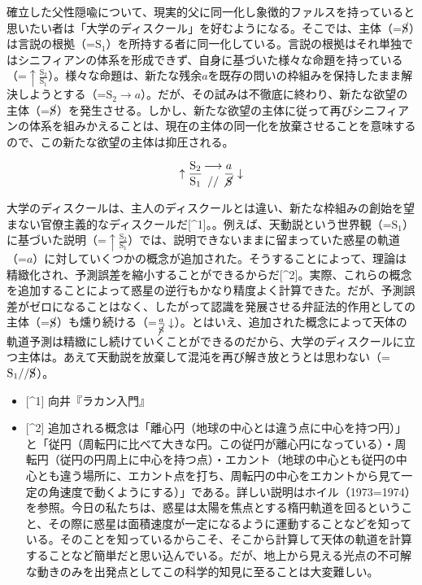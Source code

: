 確立した父性隠喩について、現実的父に同一化し象徴的ファルスを持っていると思いたい者は「大学のディスクール」を好むようになる。そこでは、主体（=\(\cancel{\textrm{S}}\)）は言説の根拠（=\(\textrm{S}_1\)）を所持する者に同一化している。言説の根拠はそれ単独ではシニフィアンの体系を形成できず、自身に基づいた様々な命題を持っている（=\(\uparrow\frac{\textrm{S}_2}{\textrm{S}_1}\)）。様々な命題は、新たな残余\(a\)を既存の問いの枠組みを保持したまま解決しようとする（=\(\textrm{S}_2\rightarrow a\)）。だが、その試みは不徹底に終わり、新たな欲望の主体（=\(\cancel{\textrm{S}}\)）を発生させる。しかし、新たな欲望の主体に従って再びシニフィアンの体系を組みかえることは、現在の主体の同一化を放棄させることを意味するので、この新たな欲望の主体は抑圧される。

\[
\uparrow\frac{\mathrm{S_2}}{\mathrm{S_1}}\genfrac{}{}{0pt}{}{\longrightarrow}{//}\frac{a}{\mathrm{\cancel{S}}}\downarrow
\]

大学のディスクールは、主人のディスクールとは違い、新たな枠組みの創始を望まない官僚主義的なディスクールだ{[}\^{}1{]}。。例えば、天動説という世界観（=\(\textrm{S}_1\)）に基づいた説明（=\(\uparrow\frac{\textrm{S}_2}{\textrm{S}_1}\)）では、説明できないままに留まっていた惑星の軌道（=\(a\)）に対していくつかの概念が追加された。そうすることによって、理論は精緻化され、予測誤差を縮小することができるからだ{[}\^{}2{]}。実際、これらの概念を追加することによって惑星の逆行もかなり精度よく計算できた。だが、予測誤差がゼロになることはなく、したがって認識を発展させる弁証法的作用としての主体（=\(\cancel{\textrm{S}}\)）も燻り続ける（=\(\frac{a}{\cancel{\textrm{S}}}\downarrow\)）。とはいえ、追加された概念によって天体の軌道予測は精緻にし続けていくことができるのだから、大学のディスクールに立つ主体は。あえて天動説を放棄して混沌を再び解き放とうとは思わない（=\(\textrm{S}_1//\cancel{\textrm{S}}\)）。

\begin{itemize}
\tightlist
\item
  {[}\^{}1{]} 向井『ラカン入門』
\item
  {[}\^{}2{]}
  追加される概念は「離心円（地球の中心とは違う点に中心を持つ円）」と「従円（周転円に比べて大きな円。この従円が離心円になっている）・周転円（従円の円周上に中心を持つ点）・エカント（地球の中心とも従円の中心とも違う場所に、エカント点を打ち、周転円の中心をエカントから見て一定の角速度で動くようにする）」である。詳しい説明はホイル（1973=1974）を参照。今日の私たちは、惑星は太陽を焦点とする楕円軌道を回るということ、その際に惑星は面積速度が一定になるように運動することなどを知っている。そのことを知っているからこそ、そこから計算して天体の軌道を計算することなど簡単だと思い込んでいる。だが、地上から見える光点の不可解な動きのみを出発点としてこの科学的知見に至ることは大変難しい。
\end{itemize}

